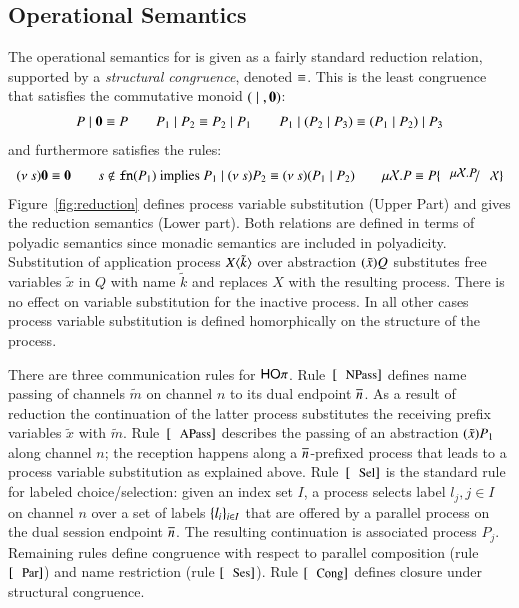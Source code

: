 \subsection{Operational Semantics}

The operational semantics for \HOp is given as a fairly standard reduction relation, supported by
a \emph{structural congruence}, denoted $\equiv$. This is 
the least congruence that satisfies the commutative monoid $(\;|\;, \mathbf{0})$:
%
\[
	\begin{array}{c}
		P \;|\; \mathbf{0} \equiv P
		\qquad
		P_1 \;|\; P_2 \equiv P_2 \;|\; P_1
		\qquad
		P_1 \;|\; (P_2 \;|\; P_3) \equiv (P_1 \;|\; P_2) \;|\; P_3
	\end{array}
\]
%
\noi and furthermore satisfies the rules:
%
\[
\begin{array}{c}
	\news{s} \inact \scong \inact
	\qquad
	s \notin \fn{P_1} \textrm{  implies  } P_1 \Par \news{s} P_2 \scong \news{s}(P_1 \Par P_2)
	\qquad
	\recp{X}{P} \scong P\subst{\recp{X}{P}}{\rvar{X}}
\end{array}
\]
%
\noi Figure~\ref{fig:reduction} defines
process variable substitution (Upper Part) and gives the 
reduction semantics (Lower part).
Both relations are defined in terms of polyadic semantics since
monadic semantics are included in polyadicity.
Substitution of application process $X\langle \tilde{k} \rangle$
over abstraction $(\tilde{x})Q$ substitutes free variables
$\tilde{x}$ in $Q$ with name $\tilde{k}$ and replaces
$X$ with the resulting process.
There is no effect on variable substitution for the inactive process.
In all other cases process variable substitution is defined
homorphically on the structure of the process.



There are three communication rules for $\mathsf{HO}\pi$. 
Rule~$\orule{NPass}$ defines name passing 
of channels $\tilde{m}$ on channel $n$ to its dual endpoint $\overline{n}$.
As a result of reduction the continuation of the 
latter process substitutes the receiving prefix variables $\tilde{x}$
with $\tilde{m}$.
Rule~$\orule{APass}$ describes
the passing of an abstraction $(\tilde{x})P_1$
along channel $n$;
the reception happens along a $\overline{n}$-prefixed process that
leads to a process variable substitution as explained above.
Rule~$\orule{Sel}$ is the standard rule for labeled choice/selection:
given an index set $I$, 
a process selects label $l_j, j \in I$ on channel $n$ over a set of
labels $\{l_i\}_{i \in I}$ that are offered by a parallel process
on the dual session endpoint $\overline{n}$.
The resulting continuation is associated process $P_j$.
Remaining rules define congruence 
with respect to parallel composition (rule $\orule{Par}$)
and name restriction (rule $\orule{Ses}$).
Rule $\orule{Cong}$ defines closure under structural congruence.




